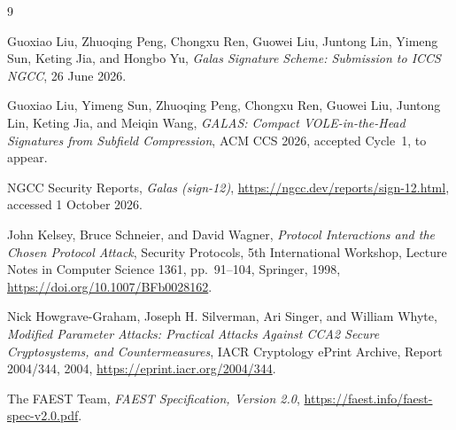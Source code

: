 \documentclass[11pt,a4paper]{article}
\begin{document}
\begin{thebibliography}{9}
\small

Guoxiao Liu, Zhuoqing Peng, Chongxu Ren, Guowei Liu, Juntong Lin, Yimeng Sun,
Keting Jia, and Hongbo Yu,
\emph{Galas Signature Scheme: Submission to ICCS NGCC}, 26 June 2026.

Guoxiao Liu, Yimeng Sun, Zhuoqing Peng, Chongxu Ren, Guowei Liu, Juntong Lin,
Keting Jia, and Meiqin Wang,
\emph{GALAS: Compact VOLE-in-the-Head Signatures from Subfield Compression},
ACM CCS 2026, accepted Cycle~1, to appear.

NGCC Security Reports,
\emph{Galas (sign-12)},
\url{https://ngcc.dev/reports/sign-12.html}, accessed 1 October 2026.

John Kelsey, Bruce Schneier, and David Wagner,
\emph{Protocol Interactions and the Chosen Protocol Attack},
Security Protocols, 5th International Workshop, Lecture Notes in Computer
Science 1361, pp.~91--104, Springer, 1998,
\url{https://doi.org/10.1007/BFb0028162}.

Nick Howgrave-Graham, Joseph H. Silverman, Ari Singer, and William Whyte,
\emph{Modified Parameter Attacks: Practical Attacks Against CCA2 Secure
Cryptosystems, and Countermeasures},
IACR Cryptology ePrint Archive, Report 2004/344, 2004,
\url{https://eprint.iacr.org/2004/344}.

The FAEST Team,
\emph{FAEST Specification, Version 2.0},
\url{https://faest.info/faest-spec-v2.0.pdf}.

\end{thebibliography}
\end{document}
